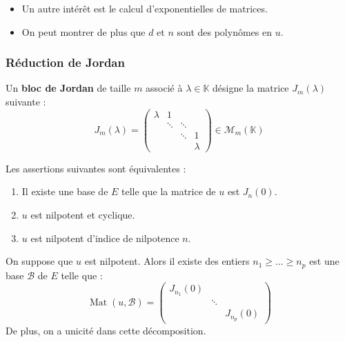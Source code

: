 	\begin{remark}
		\begin{itemize}
		  \item Un autre intérêt est le calcul d'exponentielles de matrices.
		  \item On peut montrer de plus que $d$ et $n$ sont des polynômes en $u$.
		\end{itemize}
	\end{remark}

	\subsubsection{Réduction de Jordan}


	\begin{definition}
		Un \textbf{bloc de Jordan} de taille $m$ associé à $\lambda \in \mathbb{K}$ désigne la matrice $J_m(\lambda)$ suivante :
		\[ J_m(\lambda) = \begin{pmatrix} \lambda & 1 & \\ & \ddots & \ddots & \\ & & \ddots & 1 \\ & & & \lambda \end{pmatrix} \in \mathcal{M}_m(\mathbb{K}) \]
	\end{definition}

	\begin{proposition}
		Les assertions suivantes sont équivalentes :
		\begin{enumerate}[label=(\roman*)]
			\item Il existe une base de $E$ telle que la matrice de $u$ est $J_n(0)$.
			\item $u$ est nilpotent et cyclique.
			\item $u$ est nilpotent d'indice de nilpotence $n$.
		\end{enumerate}
	\end{proposition}

	\begin{theorem}
		On suppose que $u$ est nilpotent. Alors il existe des entiers $n_1 \geq \dots \geq n_p$ est une base $\mathcal{B}$ de $E$ telle que :
		\[ \operatorname{Mat}(u, \mathcal{B}) = \begin{pmatrix} J_{n_1}(0) & & \\ & \ddots & \\ & & J_{n_p}(0) \end{pmatrix} \]
		De plus, on a unicité dans cette décomposition.
	\end{theorem}

